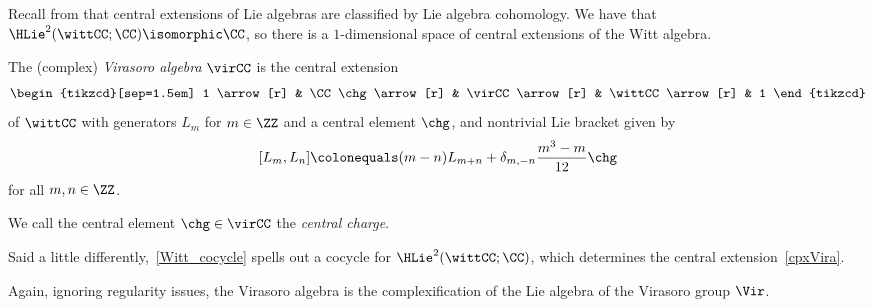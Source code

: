 \begin{nul}
Recall from  that central extensions of Lie algebras are classified by Lie algebra
cohomology. We have that $ \HLie^2(\wittCC;\CC) \isomorphic \CC $, so
there is a $ 1 $-dimensional space of central extensions of the Witt algebra.
\end{nul}

\begin{definition}
	The (complex) \textit{Virasoro algebra} $ \virCC $ is the central extension
	\begin{equation}
	\label{cpxVira}
		\begin{tikzcd}[sep=1.5em]
			1 \arrow[r] & \CC \chg \arrow[r] & \virCC \arrow[r] & \wittCC \arrow[r] & 1
		\end{tikzcd}
	\end{equation}
	of $ \wittCC $ with generators $ L_m $ for $ m \in \ZZ $ and a central element $ \chg $, and nontrivial Lie bracket given by
	\begin{equation}
	\label{Witt_cocycle}
		[L_m,L_n] \colonequals (m-n) L_{m+n} + \delta_{m,-n} \frac{m^3 - m}{12} \chg
	\end{equation}
	for all $ m,n \in \ZZ $.

	We call the central element $ \chg \in \virCC $ the \textit{central charge}.
\end{definition}
Said a little differently,~\eqref{Witt_cocycle} spells out a cocycle for $\HLie^2(\wittCC;\CC)$, which determines
the central extension~\eqref{cpxVira}.

\begin{nul}
	Again, ignoring regularity issues, the Virasoro algebra is the complexification of the Lie algebra of the Virasoro group $ \Vir $.
\end{nul}




